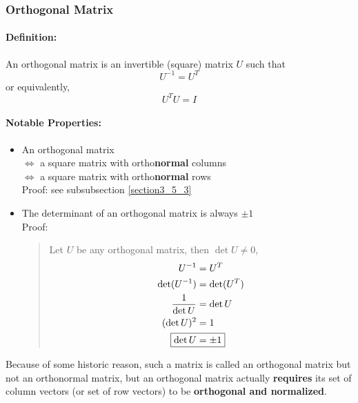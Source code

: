 \documentclass[11pt]{article}
\newcommand{\mymat}[1]{#1}
\begin{document}
    \newpage
    \subsubsection{Orthogonal Matrix}
    \paragraph{Definition: } An orthogonal matrix is an invertible (square) matrix $\mymat{U}$ such that
    \begin{equation}
        \mymat{U}^{-1} = \mymat{U}^T
    \end{equation}
    or equivalently,
    \begin{equation}
        \mymat{U}^T \mymat{U} = \mymat{I}
    \end{equation}
    \paragraph{Notable Properties: }
    \begin{itemize}
        \item An orthogonal matrix \\ 
            $\iff$ a square matrix with ortho\textbf{normal} columns \\
            $\iff$ a square matrix with ortho\textbf{normal} rows \\
            Proof: see subsubsection \ref{section3_5_3}
        \item The determinant of an orthogonal matrix is always $\pm 1$ \\
            Proof: 
            \begin{quote}
                Let $\mymat{U}$ be any orthogonal matrix, then $\det \mymat{U} \ne 0$,
                \begin{align*}
                    \mymat{U}^{-1} &= \mymat{U}^T \\
                    \det(\mymat{U}^{-1}) &= \det(\mymat{U}^T) \\
                    \frac{1}{\det\mymat{U}} &= \det \mymat{U} \\
                    ( \det \mymat{U} )^2 &= 1 \\
                    \Aboxed{\det \mymat{U} &= \pm 1}
                \end{align*}
            \end{quote}
        \end{itemize}
    Because of some historic reason, such a matrix is called an orthogonal matrix but not an orthonormal matrix, 
    but an orthogonal matrix actually \textbf{requires} its set of column vectors (or set of row vectors) to be \textbf{orthogonal and normalized}.
\end{document}
